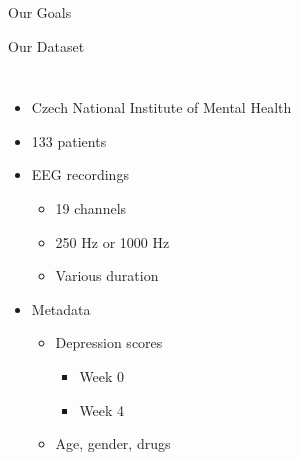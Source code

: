 \documentclass{beamer}
\begin{document}
\begin{frame}{Our Goals}
  
\end{frame}


%   


\begin{frame}{Our Dataset}
	\begin{columns}
        \begin{itemize}
            \item<1-> Czech National Institute of Mental Health
            \item<2-> 133 patients
            \item<3-> EEG recordings
              \begin{itemize}
                \item 19 channels
                \item 250 Hz or 1000 Hz
                \item Various duration
              \end{itemize}
              \item<4-> Metadata
                  \begin{itemize}
                      \item Depression scores
                          \begin{itemize}
                              \item Week 0
                              \item Week 4
                          \end{itemize}
                       \item Age, gender, drugs
                  \end{itemize}
        \end{itemize}

\end{columns}
\end{frame}
\end{document}
